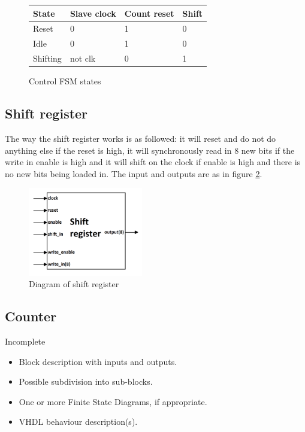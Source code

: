 \documentclass[11pt,twoside,a4paper]{article}
\begin{document}
\begin{figure}
\begin{center}
    \begin{tabular}{ | l | l | l | l |}
    \hline
    State & Slave clock & Count reset & Shift \\ \hline
    Reset & 0 & 1 & 0 \\ \hline
    Idle & 0 & 1 & 0 \\ \hline
    Shifting & not clk  & 0 & 1 \\
    \hline
    \end{tabular}
\end{center}
\caption{Control FSM states}
\label{control-states}
\end{figure}

\subsection{Shift register}
The way the shift register works is as followed: it will reset and do not do anything else if the reset is high, it will synchronously read in 8 new bits if the write in enable is high and it will shift on the clock if enable is high and there is no new bits being loaded in. The input and outputs are as in figure \ref{shift-register}.

\begin{figure}[htp!]
\center
\includegraphics[width=5cm]{./shift_register_diagram}
\caption{Diagram of shift register}
\label{shift-register}
\end{figure}

\subsection{Counter}
Incomplete
\begin{itemize}
\item
Block description with inputs and outputs.
\item
Possible subdivision into sub-blocks.
\item
One or more Finite State Diagrams, if appropriate.
\item
VHDL behaviour description(s).
\end{itemize}
\end{document}

